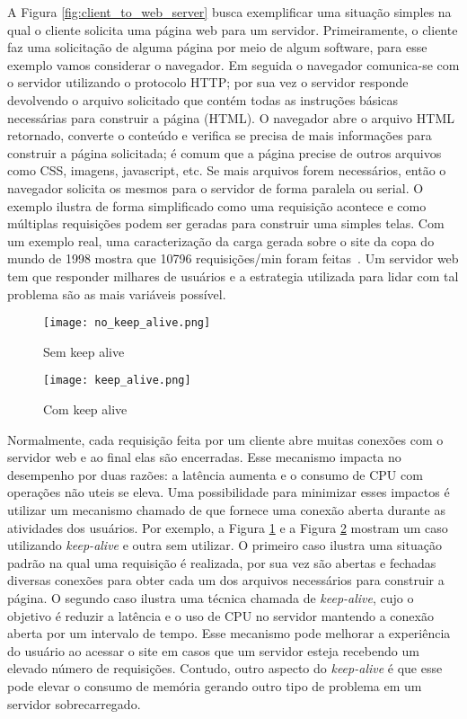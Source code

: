 A Figura \ref{fig:client_to_web_server} busca exemplificar uma situação simples
na qual o cliente solicita uma página web para um servidor. Primeiramente, o
cliente faz uma solicitação de alguma página por meio de algum software, para
esse exemplo vamos considerar o navegador. Em seguida o navegador comunica-se
com o servidor utilizando o protocolo HTTP; por sua vez o servidor responde
devolvendo o arquivo solicitado que contém todas as instruções básicas
necessárias para construir a página (HTML). O navegador abre o
arquivo HTML retornado, converte o conteúdo e verifica se precisa de mais
informações para construir a página solicitada; é comum que a página precise de
outros arquivos como CSS, imagens, javascript, etc. Se mais arquivos forem
necessários, então o navegador solicita os mesmos para o servidor de forma
paralela ou serial. O exemplo ilustra de forma simplificado como uma requisição
acontece e como múltiplas requisições podem ser geradas para construir uma
simples telas. Com um exemplo real, uma caracterização da carga gerada sobre o
site da copa do mundo de 1998 mostra que 10796 requisições/min foram
feitas~\citep{worldcup}. Um servidor web tem que responder milhares de usuários
e a estrategia utilizada para lidar com tal problema são as mais variáveis
possível.

\begin{figure}[!h]
  \centering
  \texttt{[image: no\_keep\_alive.png]}
  \caption{Sem keep alive}
  \label{fig:no_keep_alive}
\end{figure}

\begin{figure}[!h]
  \texttt{[image: keep\_alive.png]}
  \caption{Com keep alive}
  \label{fig:keep_alive}
\end{figure}

Normalmente, cada requisição feita por um cliente abre muitas conexões com o
servidor web e ao final elas são encerradas. Esse mecanismo impacta no
desempenho por duas razões: a latência aumenta e o consumo de CPU com operações
não uteis se eleva. Uma possibilidade para minimizar esses impactos é utilizar
um mecanismo chamado de  que fornece uma conexão
aberta durante as atividades dos usuários. Por exemplo, a Figura
\ref{fig:no_keep_alive} e a Figura \ref{fig:keep_alive} mostram um caso
utilizando \textit{keep-alive} e outra sem utilizar. O primeiro caso ilustra
uma situação padrão na qual uma requisição é realizada, por sua vez são abertas
e fechadas diversas conexões para obter cada um dos arquivos necessários para
construir a página. O segundo caso ilustra uma técnica chamada de
\textit{keep-alive}, cujo o objetivo é reduzir a latência e o uso de CPU no
servidor mantendo a conexão aberta por um intervalo de tempo.  Esse mecanismo
pode melhorar a experiência do usuário ao acessar o site em casos que um
servidor esteja recebendo um elevado número de requisições. Contudo, outro
aspecto do \textit{keep-alive} é que esse pode elevar o consumo de memória
gerando outro tipo de problema em um servidor sobrecarregado.

